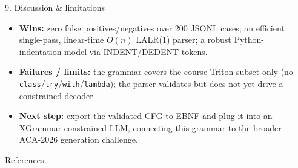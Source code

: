 \documentclass[final]{beamer}
\newlength{\sepwidth}
\newlength{\colwidth}
\newcommand{\separatorcolumn}{\begin{column}{\sepwidth}\end{column}}
\begin{document}
\begin{frame}[t]
\begin{columns}[t]
\begin{column}{\colwidth}
\begin{block}{9. Discussion \& limitations}
    \begin{itemize}
      \item \textbf{Wins:} zero false positives/negatives over 200 JSONL
        cases; an efficient single-pass, linear-time $O(n)$ LALR(1) parser;
        a robust Python-indentation model via INDENT/DEDENT tokens.
      \item \textbf{Failures / limits:} the grammar covers the course Triton
        subset only (no \texttt{class}/\texttt{try}/\texttt{with}/\texttt{lambda});
        the parser validates but does not yet drive a constrained decoder.
      \item \textbf{Next step:} export the validated CFG to EBNF and plug it
        into an XGrammar-constrained LLM, connecting this grammar to the
        broader ACA-2026 generation challenge.
    \end{itemize}

  \end{block}

  \begin{block}{References}

    \nocite{*}
    \footnotesize{}

  \end{block}

\end{column}

\separatorcolumn
\end{columns}
\end{frame}
\end{document}
